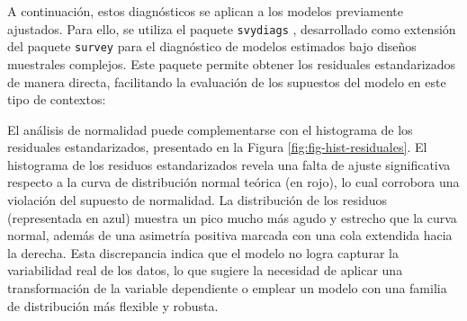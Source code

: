 \documentclass[
  spanish,
  12pt,
]{book}
\newenvironment{Shaded}{\begin{snugshade}}{\end{snugshade}}
\newcommand{\AttributeTok}[1]{\textcolor[rgb]{0.13,0.29,0.53}{#1}}
\newcommand{\DecValTok}[1]{\textcolor[rgb]{0.00,0.00,0.81}{#1}}
\newcommand{\FloatTok}[1]{\textcolor[rgb]{0.00,0.00,0.81}{#1}}
\newcommand{\FunctionTok}[1]{\textcolor[rgb]{0.13,0.29,0.53}{\textbf{#1}}}
\newcommand{\NormalTok}[1]{#1}
\newcommand{\OtherTok}[1]{\textcolor[rgb]{0.56,0.35,0.01}{#1}}
\newcommand{\SpecialCharTok}[1]{\textcolor[rgb]{0.81,0.36,0.00}{\textbf{#1}}}
\newcommand{\StringTok}[1]{\textcolor[rgb]{0.31,0.60,0.02}{#1}}
\begin{document}
A continuación, estos diagnósticos se aplican a los modelos previamente ajustados. Para ello, se utiliza el paquete \texttt{svydiags} \citep{Valliant2024}, desarrollado como extensión del paquete \texttt{survey} para el diagnóstico de modelos estimados bajo diseños muestrales complejos. Este paquete permite obtener los residuales estandarizados de manera directa, facilitando la evaluación de los supuestos del modelo en este tipo de contextos:

\begin{Shaded}
\end{Shaded}

El análisis de normalidad puede complementarse con el histograma de los residuales estandarizados, presentado en la Figura \ref{fig:fig-hist-residuales}. El histograma de los residuos estandarizados revela una falta de ajuste significativa respecto a la curva de distribución normal teórica (en rojo), lo cual corrobora una violación del supuesto de normalidad. La distribución de los residuos (representada en azul) muestra un pico mucho más agudo y estrecho que la curva normal, además de una asimetría positiva marcada con una cola extendida hacia la derecha. Esta discrepancia indica que el modelo no logra capturar la variabilidad real de los datos, lo que sugiere la necesidad de aplicar una transformación de la variable dependiente o emplear un modelo con una familia de distribución más flexible y robusta.

\begin{Shaded}
\end{Shaded}
\end{document}
